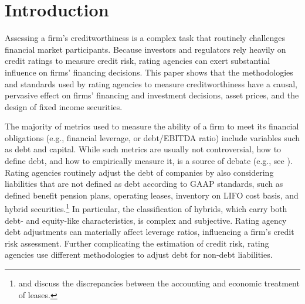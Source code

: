 \documentclass[a4paper, 12pt]{article}
\begin{document}
\section{Introduction}

Assessing a firm's creditworthiness is a complex task that routinely challenges financial market participants. Because investors and regulators rely heavily on credit ratings to measure credit risk, rating agencies can exert substantial influence on firms' financing decisions. This paper shows that the methodologies and standards used by rating agencies to measure creditworthiness have a causal, pervasive effect on firms' financing and investment decisions, asset prices, and the design of fixed income securities.

The majority of metrics used to measure the ability of a firm to meet its financial obligations (e.g., financial leverage, or debt/EBITDA ratio) include variables such as debt and capital. While such metrics are usually not controversial, how to define debt, and how to empirically measure it, is a source of debate (e.g., see \citealp{welch2011two}). Rating agencies routinely adjust the debt of companies by also considering liabilities that are not defined as debt according to GAAP standards, such as defined benefit pension plans, operating leases, inventory on LIFO cost basis, and hybrid securities.\footnote{\cite{eisfeldt2008leasing} and \cite{rampini2013collateral} discuss the discrepancies between the accounting and economic treatment of leases.} In particular, the classification of hybrids, which carry both debt- and equity-like characteristics, is complex and subjective. Rating agency debt adjustments can materially affect leverage ratios, influencing a firm's credit risk assessment. Further complicating the estimation of credit risk, rating agencies use different methodologies to adjust debt for non-debt liabilities.
\end{document}
